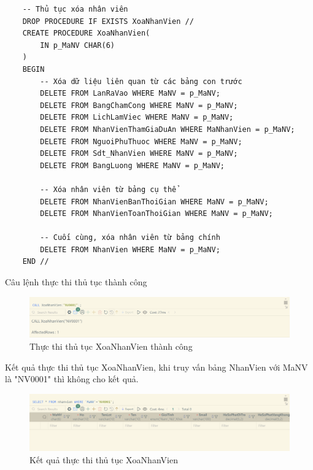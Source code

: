 \begin{verbatim}
    -- Thủ tục xóa nhân viên
    DROP PROCEDURE IF EXISTS XoaNhanVien //
    CREATE PROCEDURE XoaNhanVien(
        IN p_MaNV CHAR(6)
    )
    BEGIN
        -- Xóa dữ liệu liên quan từ các bảng con trước
        DELETE FROM LanRaVao WHERE MaNV = p_MaNV;
        DELETE FROM BangChamCong WHERE MaNV = p_MaNV;
        DELETE FROM LichLamViec WHERE MaNV = p_MaNV;
        DELETE FROM NhanVienThamGiaDuAn WHERE MaNhanVien = p_MaNV;
        DELETE FROM NguoiPhuThuoc WHERE MaNV = p_MaNV;
        DELETE FROM Sdt_NhanVien WHERE MaNV = p_MaNV;
        DELETE FROM BangLuong WHERE MaNV = p_MaNV;
    
        -- Xóa nhân viên từ bảng cụ thể
        DELETE FROM NhanVienBanThoiGian WHERE MaNV = p_MaNV;
        DELETE FROM NhanVienToanThoiGian WHERE MaNV = p_MaNV;
    
        -- Cuối cùng, xóa nhân viên từ bảng chính
        DELETE FROM NhanVien WHERE MaNV = p_MaNV;
    END //
\end{verbatim}

\newpage
Câu lệnh thực thi thủ tục thành công
\begin{figure}[H]
    \centering
    \includegraphics[width=\linewidth]{content/images/XoaNhanVien_ThanhCong.png}
    \caption{Thực thi thủ tục XoaNhanVien thành công}
    \label{fig:XoaNhanVien_ThanhCong}
\end{figure}

Kết quả thực thi thủ tục XoaNhanVien, khi truy vấn bảng NhanVien với MaNV là "NV0001" thì không cho kết quả.
\begin{figure}[H]
    \centering
    \includegraphics[width=\linewidth]{content/images/XoaNhanVien_After.png}
    \caption{Kết quả thực thi thủ tục XoaNhanVien}
    \label{fig:XoaNhanVien_After}
\end{figure}

\newpage
